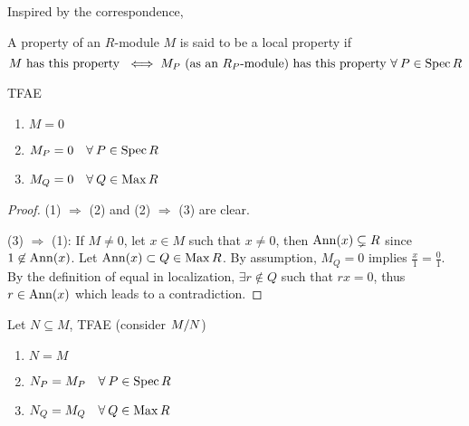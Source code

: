 \begin{remark}
  Inspired by the correspondence,
\end{remark}

\begin{definition}
  A property of an $R$-module $M$ is said to be a local property if
  \[
    M \text{ has this property } \iff M_P
    \text{ (as an $R_P$-module) has this property } \forall P \in \Spec R
  \]
\end{definition}

\begin{prop} \label{prop:module-is-zero-iff-zero-in-localization}
  TFAE
  \begin{enumerate}[(1)]
    \item $M = 0$
    \item $M_P = 0 \quad \forall P \in \Spec R$
    \item $M_Q = 0 \quad \forall Q \in \Max R$
  \end{enumerate}
  \begin{proof}
    (1) $\Rightarrow$ (2) and (2) $\Rightarrow$ (3) are clear.

    (3) $\Rightarrow$ (1):
    If $M \neq 0$, let $x \in M$ such that $x \neq 0$,
    then $\operatorname{Ann}(x) \subsetneq R$ since $1 \not\in \operatorname{Ann}(x)$.
    Let $\operatorname{Ann}(x) \subset Q \in \operatorname{Max} R$.
    By assumption, $M_Q = 0$ implies $\frac{x}{1} = \frac{0}{1}$.
    By the definition of equal in localization, $\exists r \not\in Q$
    such that $rx = 0$, thus $r \in \operatorname{Ann}(x)$ which leads to a contradiction.
  \end{proof}
\end{prop}

\begin{coro} \label{coro:modules-are-equal-iff-equal-in-localization}
  Let $N \subseteq M$, TFAE (consider ${M}/{N}$)
  \begin{enumerate}[(1)]
    \item $N = M$
    \item $N_P = M_P \quad \forall P \in \Spec R$
    \item $N_Q = M_Q \quad \forall Q \in \Max R$
  \end{enumerate}
\end{coro}

